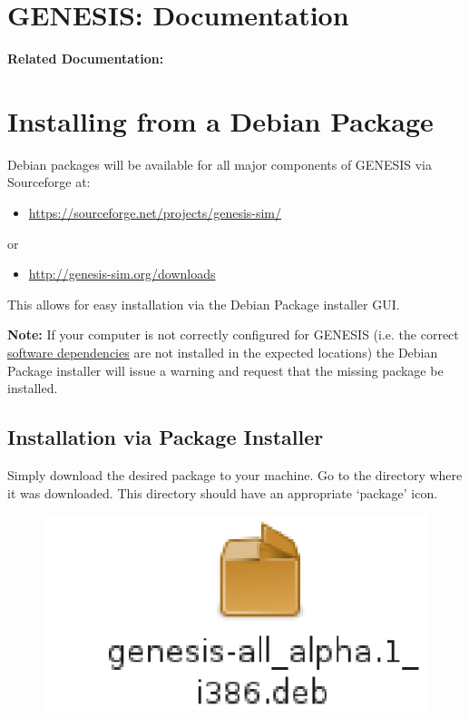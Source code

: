 \documentclass[12pt]{article}
\begin{document}
\section*{GENESIS: Documentation}

{\bf Related Documentation:}

\section*{Installing from a Debian Package}

Debian packages will be available for all major components of GENESIS via Sourceforge at:
\begin{itemize}
   \item[]\href{https://sourceforge.net/projects/genesis-sim/}{https://sourceforge.net/projects/genesis-sim/}
\end{itemize}
\noindent or
\begin{itemize}
   \item[]\href{http://genesis-sim.org/downloads}{http://genesis-sim.org/downloads}
\end{itemize}
This allows for easy installation via the Debian Package installer GUI.

{\bf Note:} If your computer is not correctly configured for GENESIS (i.e. the correct \href{../genesis-dependencies/genesis-dependencies.tex}{software dependencies} are not installed in the expected locations) the Debian Package installer will issue a warning and request that the missing package be installed.

\subsection*{Installation via Package Installer}

Simply download the desired package to your machine. Go to the directory where it was downloaded. This directory should have an appropriate `package' icon.

\begin{figure}[h]
   \centering
   \includegraphics[scale=1]{figures/install-user-deb-icon.eps}
\end{figure}
\end{document}
